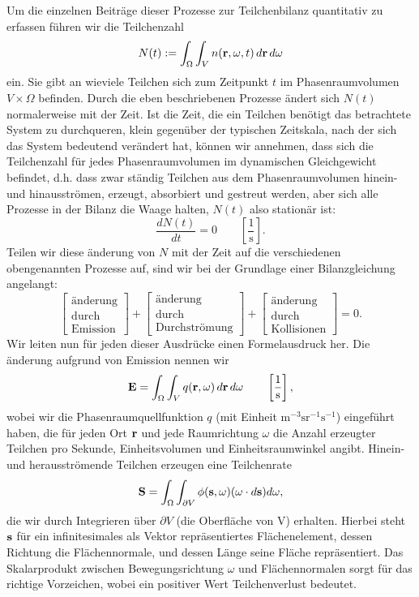 	Um die einzelnen Beiträge dieser Prozesse zur Teilchenbilanz quantitativ zu erfassen führen wir die Teilchenzahl $$N(t):=\int_\Omega \int_V n(\mathbf{r},\omega,t)\,d\mathbf{r}\,d\omega$$ ein. Sie gibt an wieviele Teilchen sich zum Zeitpunkt $t$ im Phasenraumvolumen $V \times \Omega$ befinden. Durch die eben beschriebenen Prozesse ändert sich $N(t)$ normalerweise mit der Zeit. Ist die Zeit, die ein Teilchen benötigt das betrachtete System zu durchqueren, klein gegenüber der typischen Zeitskala, nach der sich das System bedeutend verändert hat, können wir annehmen, dass sich die Teilchenzahl für jedes Phasenraumvolumen im dynamischen Gleichgewicht befindet, d.h. dass zwar ständig Teilchen aus dem Phasenraumvolumen hinein- und hinausströmen, erzeugt, absorbiert und gestreut werden, aber sich alle Prozesse in der Bilanz die Waage halten, $N(t)$ also stationär ist:$$\frac{dN(t)}{dt}=0\qquad\left[\frac{1}{\text{s}}\right].$$ Teilen wir diese änderung von $N$ mit der Zeit auf die verschiedenen obengenannten Prozesse auf, sind wir bei der Grundlage einer Bilanzgleichung angelangt:$$\begin{bmatrix}\text{änderung}\\ \text{durch}\\ \text{Emission}\end{bmatrix}+\begin{bmatrix}\text{änderung}\\ \text{durch}\\ \text{Durchströmung}\end{bmatrix}+\begin{bmatrix}\text{änderung}\\ \text{durch}\\ \text{Kollisionen}\end{bmatrix}=0.$$ Wir leiten nun für jeden dieser Ausdrücke einen Formelausdruck her.
	Die änderung aufgrund von Emission nennen wir $$\mathbf{E}=\int_\Omega \int_V q(\mathbf{r},\omega)\,d\mathbf{r}\,d\omega\qquad\left[\frac{1}{\text{s}}\right],$$ wobei wir die Phasenraumquellfunktion $q$ (mit Einheit $\text{m}^{-3}\text{sr}^{-1}\text{s}^{-1}$) eingeführt haben, die für jeden Ort $\mathbf{r}$ und jede Raumrichtung $\omega$ die Anzahl erzeugter Teilchen pro Sekunde, Einheitsvolumen und Einheitsraumwinkel angibt. Hinein- und herausströmende Teilchen erzeugen eine Teilchenrate
	$$\mathbf{S}=\int_\Omega \int_{\partial V} \phi(\mathbf{s},\omega)(\omega \cdot d\mathbf{s})d\omega,$$
	die wir durch Integrieren über $\partial V$ (die Oberfläche von V) erhalten. Hierbei steht $\mathbf{s}$ für ein infinitesimales als Vektor repräsentiertes Flächenelement, dessen Richtung die Flächennormale, und dessen Länge seine Fläche repräsentiert. Das Skalarprodukt zwischen Bewegungsrichtung $\omega$ und Flächennormalen sorgt für das richtige Vorzeichen, wobei ein positiver Wert Teilchenverlust bedeutet.
